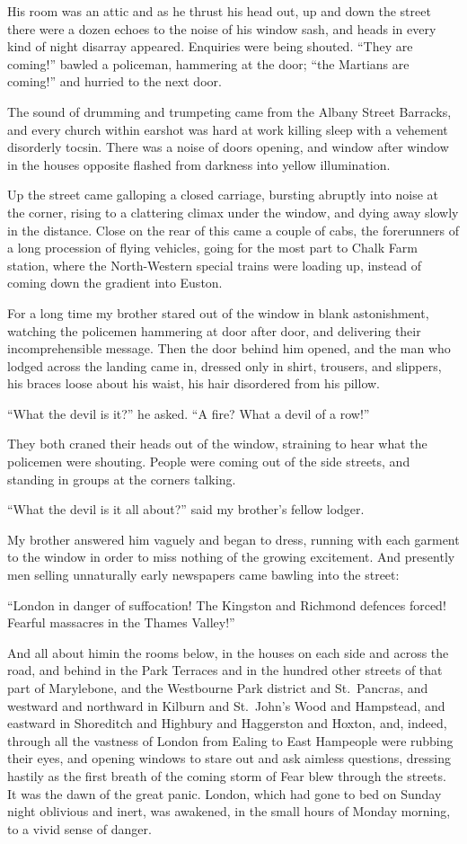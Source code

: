 His room was an attic and as he thrust his head out, up and down
the street there were a dozen echoes to the noise of his window
sash, and heads in every kind of night disarray appeared. Enquiries
were being shouted. ``They are coming!'' bawled a policeman,
hammering at the door; ``the Martians are coming!'' and hurried to
the next door.

The sound of drumming and trumpeting came from the Albany Street
Barracks, and every church within earshot was hard at work killing
sleep with a vehement disorderly tocsin. There was a noise of doors
opening, and window after window in the houses opposite flashed
from darkness into yellow illumination.

Up the street came galloping a closed carriage, bursting abruptly
into noise at the corner, rising to a clattering climax under the
window, and dying away slowly in the distance. Close on the rear of
this came a couple of cabs, the forerunners of a long procession of
flying vehicles, going for the most part to Chalk Farm station,
where the North-Western special trains were loading up, instead of
coming down the gradient into Euston.

For a long time my brother stared out of the window in blank
astonishment, watching the policemen hammering at door after door,
and delivering their incomprehensible message. Then the door behind
him opened, and the man who lodged across the landing came in,
dressed only in shirt, trousers, and slippers, his braces loose
about his waist, his hair disordered from his pillow.

``What the devil is it?'' he asked. ``A fire? What a devil of a row!''

They both craned their heads out of the window, straining to hear
what the policemen were shouting. People were coming out of the
side streets, and standing in groups at the corners talking.

``What the devil is it all about?'' said my brother's fellow lodger.

My brother answered him vaguely and began to dress, running with
each garment to the window in order to miss nothing of the growing
excitement. And presently men selling unnaturally early newspapers
came bawling into the street:

``London in danger of suffocation! The Kingston and Richmond
defences forced! Fearful massacres in the Thames Valley!''

And all about him\dash{}in the rooms below, in the houses on each side
and across the road, and behind in the Park Terraces and in the
hundred other streets of that part of Marylebone, and the
Westbourne Park district and St.\ Pancras, and westward and
northward in Kilburn and St.\ John's Wood and Hampstead, and
eastward in Shoreditch and Highbury and Haggerston and Hoxton, and,
indeed, through all the vastness of London from Ealing to East
Ham\dash{}people were rubbing their eyes, and opening windows to stare
out and ask aimless questions, dressing hastily as the first breath
of the coming storm of Fear blew through the streets. It was the
dawn of the great panic. London, which had gone to bed on Sunday
night oblivious and inert, was awakened, in the small hours of
Monday morning, to a vivid sense of danger.

